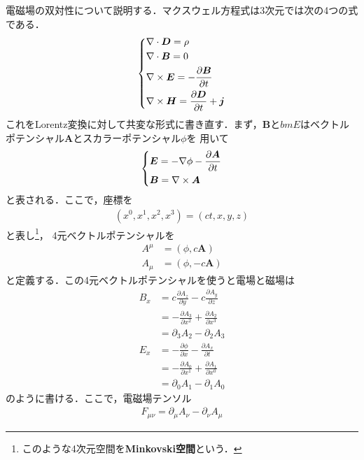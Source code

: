 \documentclass{report}
\begin{document}
  電磁場の双対性について説明する．マクスウェル方程式は3次元では次の4つの式である．
  \begin{align}
    \begin{dcases}
      \nabla \cdot \bm{D} = \rho \\
      \nabla \cdot \bm{B} = 0\\
      \nabla \times \bm{E} = - \frac{\partial \bm{B}}{\partial t}\\
      \nabla \times \bm{H} = \frac{\partial \bm{D}}{\partial t} + \bm{j}
    \end{dcases}
  \end{align}
  これをLorentz変換に対して共変な形式に書き直す．まず，$\bm{B}$と$bm{E}$はベクトルポテンシャル$\bm{A}$とスカラーポテンシャル$\phi$を
  用いて
  \begin{align}
    \begin{dcases}
      \bm{E} = -\nabla \phi - \frac{\partial \bm{A}}{\partial t}\\
      \bm{B} = \nabla \times \bm{A}
    \end{dcases}
  \end{align}
  と表される．ここで，座標を
  \begin{align}
    (x^0, x^1, x^2, x^3) = (ct, x, y, z)
  \end{align}
  と表し\footnote{
   このような4次元空間を\textbf{Minkovski空間}という． 
  }，
  4元ベクトルポテンシャルを
  \begin{align}
    A^{\mu} &= (\phi, c\bm{A})\\
    A_{\mu} &= (\phi, -c\bm{A})
  \end{align}
  と定義する．この4元ベクトルポテンシャルを使うと電場と磁場は
  \begin{align}
    B_x &= c \frac{\partial A_z}{\partial y} - c \frac{\partial A_y}{\partial z}\\
    &= -\frac{\partial A_3}{\partial x^2} + \frac{\partial A_2}{\partial x^3}\\
    &= \partial_3 A_2 - \partial_2 A_3\\
    E_x &= -\frac{\partial \phi}{\partial x} - \frac{\partial A_x}{\partial t}\\
    &= -\frac{\partial A_0}{\partial x^1} + \frac{\partial A_1}{\partial x^0}\\
    &= \partial_0 A_1 - \partial_1 A_0
  \end{align}
  のように書ける．ここで，電磁場テンソル
  \begin{align}
    F_{\mu\nu} = \partial_{\mu}A_\nu - \partial_\nu A_\mu
  \end{align}
\end{document}
